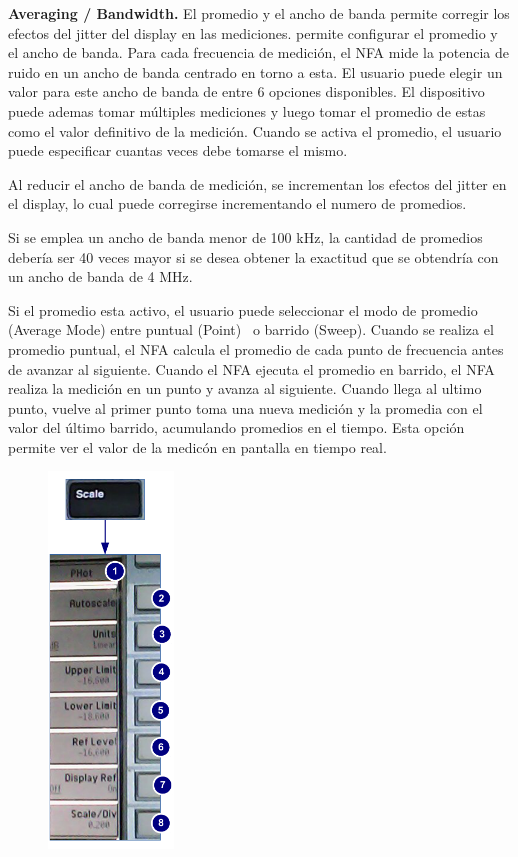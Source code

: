 {\begin{minipage}[t]{\textwidth}
		\textbf{Averaging / Bandwidth.} El promedio y el ancho de banda permite corregir los efectos del jitter del display en las mediciones. permite configurar el promedio y el ancho de banda. Para cada frecuencia de medición, el NFA mide la potencia de ruido en un ancho de banda centrado en torno a esta. El usuario puede elegir un valor para este ancho de banda de entre 6 opciones disponibles. El dispositivo puede ademas tomar múltiples mediciones y luego tomar el promedio de estas como el valor
		definitivo de la medición. Cuando se activa el promedio, el usuario puede especificar cuantas veces debe tomarse el mismo.	
		
		Al reducir el ancho de banda de medición, se incrementan los efectos del jitter en el display, lo cual puede corregirse incrementando el numero de promedios.
		
		Si se emplea un ancho de banda menor de 100 kHz, la cantidad de promedios debería ser 40 veces mayor si se desea obtener	la exactitud que se obtendría con un ancho de banda de 4 MHz.
		
		Si el promedio esta activo, el usuario puede seleccionar el modo de promedio (Average Mode) entre puntual (Point) \ o barrido (Sweep). Cuando se realiza el promedio puntual, el NFA calcula el promedio de	cada punto de frecuencia antes de avanzar al siguiente. Cuando el NFA ejecuta el promedio en barrido, el NFA realiza la	medición en un punto y avanza al siguiente. Cuando llega al ultimo punto, vuelve al primer punto toma una nueva medición y la promedia con el valor del último barrido, acumulando promedios en el tiempo. Esta opción permite ver el valor de la medicón en pantalla en tiempo real.
	\end{minipage}
	
	\begin{minipage}[t][11cm]{\textwidth}
		\begin{figure}		
			\centering
			\includegraphics[height=10cm]{./Imagenes/MenuScaleN8975A.pdf}	
		\end{figure}
		

\end{minipage}}
